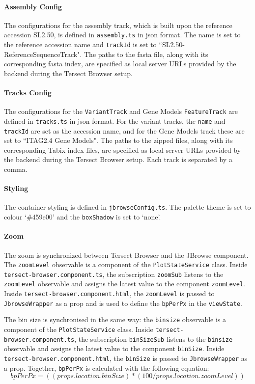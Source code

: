 \documentclass[12pt]{article}
\begin{document}
\paragraph{Assembly Config}

The configurations for the assembly track, which is built upon the reference accession SL2.50, is defined in \verb +assembly.ts+ in json format. The name is set to the reference accession name and \verb +trackId+ is set to ``SL2.50-ReferenceSequenceTrack". The paths to the fasta file, along with its corresponding fasta index, are specified as local server URLs provided by the backend during the Tersect Browser setup. 

\paragraph{Tracks Config} 
The configurations for the \verb +VariantTrack+ and Gene Models \verb +FeatureTrack+ are defined in \verb +tracks.ts+ in json format. For the variant tracks, the \verb +name+ and \verb +trackId+ are set as the accession name, and for the Gene Models track these are set to ``ITAG2.4 Gene Models".  The paths to the zipped files, along with its corresponding Tabix index files, are specified as local server URLs provided by the backend during the Tersect Browser setup. Each track is separated by a comma. 

\paragraph{Styling}
The container styling is defined in \verb +jbrowseConfig.ts+. The palette theme is set to colour `\#459e00' and the \verb +boxShadow+ is set to `none'. 

\paragraph{Zoom} 
The zoom is synchronized between Tersect Browser and the JBrowse component. The \verb +zoomLevel+ observable is a component of the \verb +PlotStateService+ class. Inside \verb +tersect-browser.component.ts+, the subscription \verb +zoomSub+ listens to the \verb +zoomLevel+ observable and assigns the latest value to the component \verb +zoomLevel+. Inside \verb +tersect-browser.component.html+, the \verb +zoomLevel+ is passed to \verb +JbrowseWrapper+ as a prop and is used to define the \verb +bpPerPx+ in the \verb +viewState+. 

The bin size is synchronised in the same way: the \verb +binsize+ observable is a component of the \verb +PlotStateService+ class. Inside \verb +tersect-browser.component.ts+, the subscription \verb +binSizeSub+ listens to the \verb +binsize+ observable and assigns the latest value to the component \verb +binSize+. Inside \verb +tersect-browser.component.html+, the \verb +binSize+ is passed to \verb +JbrowseWrapper+ as a prop. 
Together, \verb +bpPerPx+ is calculated with the following equation: \begin{equation} bpPerPx = ((props.location.binSize) * (100 /props.location.zoomLevel)) \end{equation}
\end{document}
